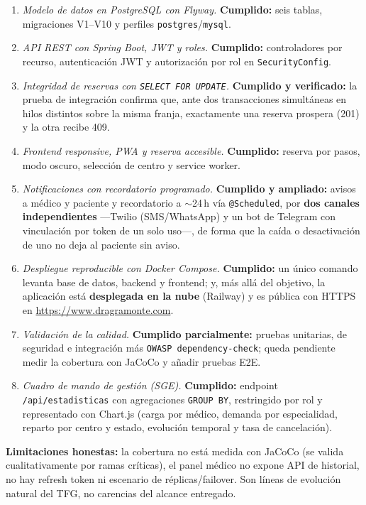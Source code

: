 \documentclass[12pt,a4paper]{report}
\begin{document}
\begin{enumerate}
  \item \emph{Modelo de datos en PostgreSQL con Flyway.} \textbf{Cumplido:} seis tablas, migraciones V1--V10 y perfiles \texttt{postgres}/\texttt{mysql}.
  \item \emph{API REST con Spring Boot, JWT y roles.} \textbf{Cumplido:} controladores por recurso, autenticación JWT y autorización por rol en \texttt{SecurityConfig}.
  \item \emph{Integridad de reservas con \texttt{SELECT FOR UPDATE}.} \textbf{Cumplido y verificado:} la prueba de integración confirma que, ante dos transacciones simultáneas en hilos distintos sobre la misma franja, exactamente una reserva prospera (201) y la otra recibe 409.
  \item \emph{Frontend responsive, PWA y reserva accesible.} \textbf{Cumplido:} reserva por pasos, modo oscuro, selección de centro y service worker.
  \item \emph{Notificaciones con recordatorio programado.} \textbf{Cumplido y ampliado:} avisos a médico y paciente y recordatorio a $\sim$24\,h vía \texttt{@Scheduled}, por \textbf{dos canales independientes} —Twilio (SMS/WhatsApp) y un bot de Telegram con vinculación por token de un solo uso—, de forma que la caída o desactivación de uno no deja al paciente sin aviso.
  \item \emph{Despliegue reproducible con Docker Compose.} \textbf{Cumplido:} un único comando levanta base de datos, backend y frontend; y, más allá del objetivo, la aplicación está \textbf{desplegada en la nube} (Railway) y es pública con HTTPS en \url{https://www.dragramonte.com}.
  \item \emph{Validación de la calidad.} \textbf{Cumplido parcialmente:} pruebas unitarias, de seguridad e integración más \texttt{OWASP dependency-check}; queda pendiente medir la cobertura con JaCoCo y añadir pruebas E2E.
  \item \emph{Cuadro de mando de gestión (SGE).} \textbf{Cumplido:} endpoint \texttt{/api/estadisticas} con agregaciones \texttt{GROUP BY}, restringido por rol y representado con Chart.js (carga por médico, demanda por especialidad, reparto por centro y estado, evolución temporal y tasa de cancelación).
\end{enumerate}

\textbf{Limitaciones honestas:} la cobertura no está medida con JaCoCo (se valida cualitativamente por ramas críticas), el panel médico no expone API de historial, no hay refresh token ni escenario de réplicas/failover. Son líneas de evolución natural del TFG, no carencias del alcance entregado.
\end{document}
